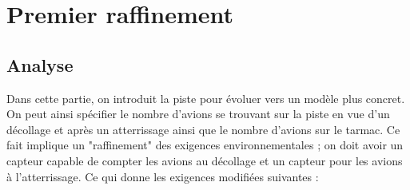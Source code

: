 \section{Premier raffinement}

\subsection{Analyse}
Dans cette partie, on introduit la piste pour évoluer vers un modèle plus concret. On peut ainsi spécifier le nombre d'avions se trouvant sur la piste en vue  d'un décollage et après un atterrissage ainsi que le nombre d'avions sur le tarmac.
Ce fait implique un "raffinement" des exigences environnementales ; on doit avoir un capteur capable de compter les avions au décollage et un capteur pour les avions à l'atterrissage. Ce qui donne les exigences modifiées suivantes :


